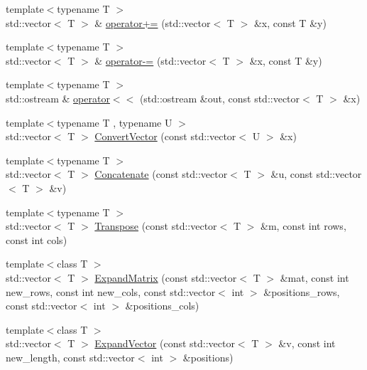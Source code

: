 \begin{DoxyCompactItemize}
\item 
{\footnotesize template$<$typename T $>$ }\\std\+::vector$<$ T $>$ \& \hyperlink{namespace_c_o_n_t_r_a_l_i_g_n_a9a01fa9073f79bc1871fd38aedeb8ac3}{operator+=} (std\+::vector$<$ T $>$ \&x, const T \&y)
\item 
{\footnotesize template$<$typename T $>$ }\\std\+::vector$<$ T $>$ \& \hyperlink{namespace_c_o_n_t_r_a_l_i_g_n_a47ed1e3a7df88433ef471e9ae68d8cdf}{operator-\/=} (std\+::vector$<$ T $>$ \&x, const T \&y)
\item 
{\footnotesize template$<$typename T $>$ }\\std\+::ostream \& \hyperlink{namespace_c_o_n_t_r_a_l_i_g_n_a837e827bff6e65e98e8c1cc9c2a34d28}{operator$<$$<$} (std\+::ostream \&out, const std\+::vector$<$ T $>$ \&x)
\item 
{\footnotesize template$<$typename T , typename U $>$ }\\std\+::vector$<$ T $>$ \hyperlink{namespace_c_o_n_t_r_a_l_i_g_n_a7482cc725c843303831d85acb4807163}{Convert\+Vector} (const std\+::vector$<$ U $>$ \&x)
\item 
{\footnotesize template$<$typename T $>$ }\\std\+::vector$<$ T $>$ \hyperlink{namespace_c_o_n_t_r_a_l_i_g_n_a1c2096f8a125b6a778f5fe8ef8c6b93a}{Concatenate} (const std\+::vector$<$ T $>$ \&u, const std\+::vector$<$ T $>$ \&v)
\item 
{\footnotesize template$<$typename T $>$ }\\std\+::vector$<$ T $>$ \hyperlink{namespace_c_o_n_t_r_a_l_i_g_n_ad43313a97ba0a47e7858d11c88f9da36}{Transpose} (const std\+::vector$<$ T $>$ \&m, const int rows, const int cols)
\item 
{\footnotesize template$<$class T $>$ }\\std\+::vector$<$ T $>$ \hyperlink{namespace_c_o_n_t_r_a_l_i_g_n_a53a2e031c10b47dedfcaab61f97c0c4b}{Expand\+Matrix} (const std\+::vector$<$ T $>$ \&mat, const int new\+\_\+rows, const int new\+\_\+cols, const std\+::vector$<$ int $>$ \&positions\+\_\+rows, const std\+::vector$<$ int $>$ \&positions\+\_\+cols)
\item 
{\footnotesize template$<$class T $>$ }\\std\+::vector$<$ T $>$ \hyperlink{namespace_c_o_n_t_r_a_l_i_g_n_a565dbfcc2a892a5a9d55c1dafc1a77bf}{Expand\+Vector} (const std\+::vector$<$ T $>$ \&v, const int new\+\_\+length, const std\+::vector$<$ int $>$ \&positions)
\item 

\end{DoxyCompactItemize}
